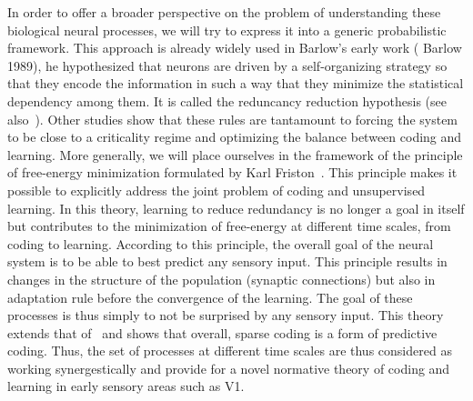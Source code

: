 \documentclass[a4paper, 11pt, draft]{article} %
\begin{document}
In order to offer a broader perspective on the problem of understanding these biological neural processes, we will try to express it into a generic probabilistic framework. 
This approach is already widely used in Barlow's early work ( Barlow 1989), he hypothesized that neurons are driven by a self-organizing strategy so that they encode the information in such a way that they minimize the statistical dependency among them. It is called the reduncancy reduction hypothesis (see also~\citep{Atick92}). %
Other studies show that these rules are tantamount to forcing the system to be close to a criticality regime and optimizing the balance between coding and learning. %
More generally, we will place ourselves in the framework of the principle of free-energy minimization formulated by Karl Friston~\citep{Friston12}. This principle makes it possible to explicitly address the joint problem of coding and unsupervised learning. In this theory, learning to reduce redundancy is no longer a goal in itself but contributes to the minimization of free-energy at different time scales, from coding to learning. According to this principle, the overall goal of the neural system is to be able to best predict any sensory input. This principle results in changes in the structure of the population (synaptic connections) but also in adaptation rule before the convergence of the learning. The goal of these processes is thus simply to not be surprised by any sensory input. This theory extends that of~\citep{Olshausen97} and shows that overall, sparse coding is a form of predictive coding. Thus, the set of processes at different time scales are thus considered as working synergestically and provide for a novel normative theory of coding and learning in early sensory areas such as V1.
\end{document}
